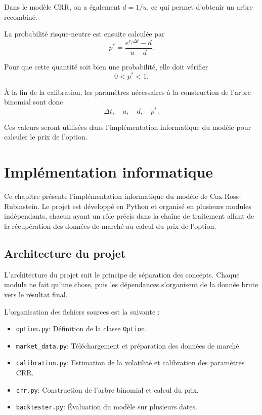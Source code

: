 \documentclass[11pt]{report}
\begin{document}
Dans le modèle CRR, on a également $d = 1/u$, ce qui permet d'obtenir un arbre recombiné.

La probabilité risque-neutre est ensuite calculée par
\[
p^* = \frac{e^{r_f \Delta t} - d}{u - d}.
\]

Pour que cette quantité soit bien une probabilité, elle doit vérifier
\[
0 < p^* < 1.
\]

À la fin de la calibration, les paramètres nécessaires à la construction de l'arbre binomial sont donc
\[
\Delta t, \quad u, \quad d, \quad p^*.
\]

Ces valeurs seront utilisées dans l'implémentation informatique du modèle pour calculer le prix de l'option.


\chapter{Implémentation informatique}

Ce chapitre présente l'implémentation informatique du modèle de Cox-Ross-Rubinstein.
Le projet est développé en Python et organisé en plusieurs modules indépendants,
chacun ayant un rôle précis dans la chaîne de traitement allant de la récupération
des données de marché au calcul du prix de l'option.

\section{Architecture du projet}

L'architecture du projet suit le principe de séparation des concepts. Chaque module ne fait qu'une chose, puis les dépendances s'organisent de la donnée brute vers le résultat final.

L'organisation des fichiers sources est la suivante :

\begin{itemize}
    \item \texttt{option.py}: Définition de la classe \texttt{Option}.
    \item \texttt{market\_data.py}: Téléchargement et préparation des données de marché.
    \item \texttt{calibration.py}: Estimation de la volatilité et calibration des paramètres CRR.
    \item \texttt{crr.py}: Construction de l'arbre binomial et calcul du prix.
    \item \texttt{backtester.py}: Évaluation du modèle sur plusieurs dates.
\end{itemize}
\end{document}
